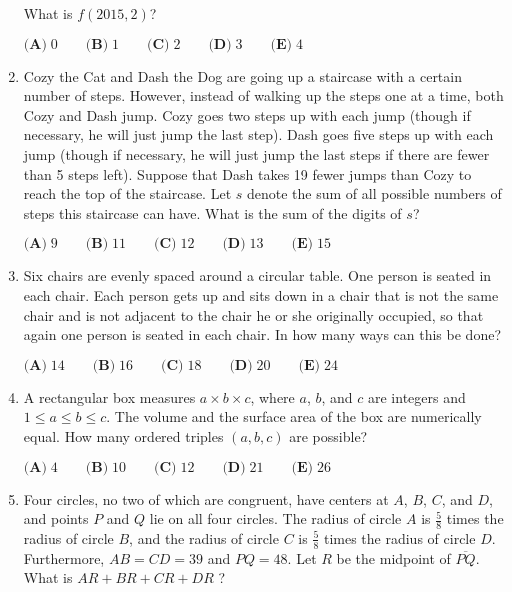 \documentclass{article}
\begin{document}
\begin{enumerate}[label=\arabic*., itemsep=0.5em]
What is \(f(2015,2)\)?

\(\textbf{(A)}\; 0 \qquad\textbf{(B)}\; 1 \qquad\textbf{(C)}\; 2 \qquad\textbf{(D)}\; 3 \qquad\textbf{(E)}\; 4\)\par \vspace{0.5em}\item Cozy the Cat and Dash the Dog are going up a staircase with a certain number of steps. However, instead of walking up the steps one at a time, both Cozy and Dash jump. Cozy goes two steps up with each jump (though if necessary, he will just jump the last step). Dash goes five steps up with each jump (though if necessary, he will just jump the last steps if there are fewer than 5 steps left). Suppose that Dash takes 19 fewer jumps than Cozy to reach the top of the staircase. Let \(s\) denote the sum of all possible numbers of steps this staircase can have. What is the sum of the digits of \(s\)?

\(\textbf{(A)}\; 9 \qquad\textbf{(B)}\; 11 \qquad\textbf{(C)}\; 12 \qquad\textbf{(D)}\; 13 \qquad\textbf{(E)}\; 15\)\par \vspace{0.5em}\item Six chairs are evenly spaced around a circular table. One person is seated in each chair. Each person gets up and sits down in a chair that is not the same chair and is not adjacent to the chair he or she originally occupied, so that again one person is seated in each chair. In how many ways can this be done?

\(\textbf{(A)}\; 14 \qquad\textbf{(B)}\; 16 \qquad\textbf{(C)}\; 18 \qquad\textbf{(D)}\; 20 \qquad\textbf{(E)}\; 24\)\par \vspace{0.5em}\item A rectangular box measures \(a \times b \times c\), where \(a\), \(b\), and \(c\) are integers and \(1\leq a \leq b \leq c\). The volume and the surface area of the box are numerically equal. How many ordered triples \((a,b,c)\) are possible?

\(\textbf{(A)}\; 4 \qquad\textbf{(B)}\; 10 \qquad\textbf{(C)}\; 12 \qquad\textbf{(D)}\; 21 \qquad\textbf{(E)}\; 26\)\par \vspace{0.5em}\item Four circles, no two of which are congruent, have centers at \(A\), \(B\), \(C\), and \(D\), and points \(P\) and \(Q\) lie on all four circles. The radius of circle \(A\) is \(\tfrac{5}{8}\) times the radius of circle \(B\), and the radius of circle \(C\) is \(\tfrac{5}{8}\) times the radius of circle \(D\). Furthermore, \(AB = CD = 39\) and \(PQ = 48\). Let \(R\) be the midpoint of \(\overline{PQ}\). What is \(AR+BR+CR+DR\) ?


\end{enumerate}
\end{document}
